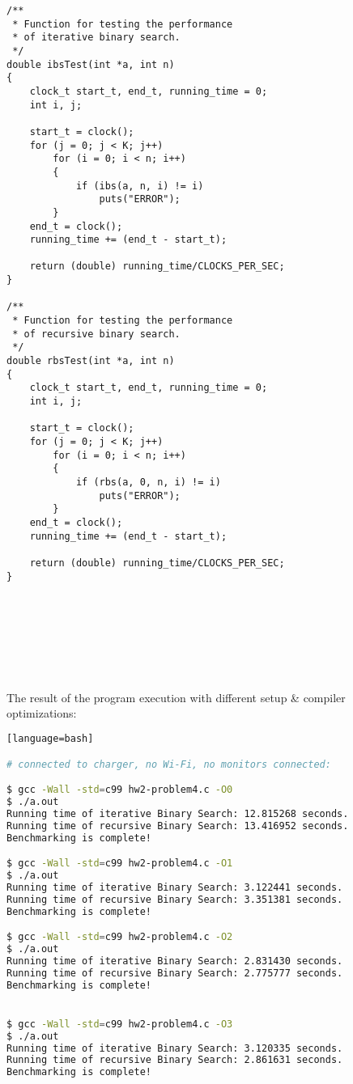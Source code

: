 \documentclass{article}
\begin{document}
\begin{verbatim}
/**
 * Function for testing the performance
 * of iterative binary search.
 */
double ibsTest(int *a, int n)
{
    clock_t start_t, end_t, running_time = 0;
    int i, j;

    start_t = clock();
    for (j = 0; j < K; j++)
        for (i = 0; i < n; i++)
        {
            if (ibs(a, n, i) != i)
                puts("ERROR");
        }
    end_t = clock();
    running_time += (end_t - start_t);

    return (double) running_time/CLOCKS_PER_SEC;
}

/**
 * Function for testing the performance
 * of recursive binary search.
 */
double rbsTest(int *a, int n)
{
    clock_t start_t, end_t, running_time = 0;
    int i, j;

    start_t = clock();
    for (j = 0; j < K; j++)
        for (i = 0; i < n; i++)
        {
            if (rbs(a, 0, n, i) != i)
                puts("ERROR");
        }
    end_t = clock();
    running_time += (end_t - start_t);

    return (double) running_time/CLOCKS_PER_SEC;
}

		\end{verbatim}


\paragraph{}\
\paragraph{}\
\paragraph{}\




\noindent The result of the program execution with different setup \& compiler optimizations:



	
	\ttfamily
	\begin{lstlisting}[basicstyle=\small, language=bash][language=bash]

# connected to charger, no Wi-Fi, no monitors connected:

$ gcc -Wall -std=c99 hw2-problem4.c -O0
$ ./a.out
Running time of iterative Binary Search: 12.815268 seconds.
Running time of recursive Binary Search: 13.416952 seconds.
Benchmarking is complete!

$ gcc -Wall -std=c99 hw2-problem4.c -O1
$ ./a.out
Running time of iterative Binary Search: 3.122441 seconds.
Running time of recursive Binary Search: 3.351381 seconds.
Benchmarking is complete!

$ gcc -Wall -std=c99 hw2-problem4.c -O2
$ ./a.out
Running time of iterative Binary Search: 2.831430 seconds.
Running time of recursive Binary Search: 2.775777 seconds.
Benchmarking is complete!


$ gcc -Wall -std=c99 hw2-problem4.c -O3
$ ./a.out
Running time of iterative Binary Search: 3.120335 seconds.
Running time of recursive Binary Search: 2.861631 seconds.
Benchmarking is complete!
	\end{lstlisting}
\end{document}
